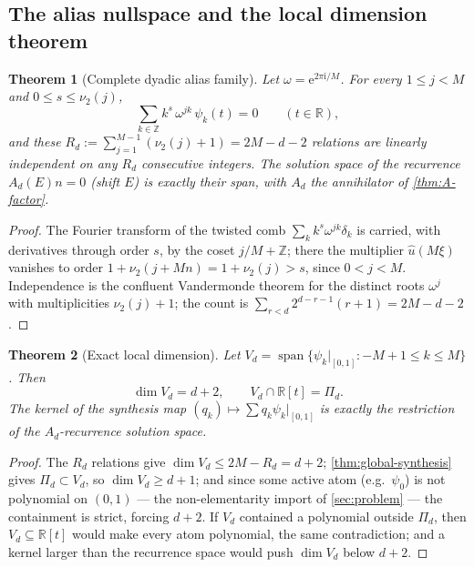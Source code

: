 \documentclass[11pt,oneside]{article}
\numberwithin{equation}{section}
\newtheorem{theorem}{Theorem}[section]
\theoremstyle{definition}
\theoremstyle{remark}
\newcommand{\R}{\mathbb R}
\newcommand{\Z}{\mathbb Z}
\newcommand{\e}{\mathrm e}
\newcommand{\ii}{\mathrm i}
\newcommand{\vtwo}{\nu_2}
\newcommand{\Span}{\operatorname{span}}
\newcommand{\PiD}{\Pi_d}
\begin{document}
\subsection{The alias nullspace and the local dimension theorem}

\begin{theorem}[Complete dyadic alias family]
\label{thm:alias-family}
Let $\omega=\e^{2\pi\ii/M}$.  For every $1\le j<M$ and
$0\le s\le\vtwo(j)$,
\begin{equation}
 \sum_{k\in\Z}k^{s}\,\omega^{jk}\,\psi_k(t)=0
 \qquad(t\in\R),
 \label{eq:alias-zero}
\end{equation}
and these $R_d:=\sum_{j=1}^{M-1}(\vtwo(j)+1)=2M-d-2$ relations are
linearly independent on any $R_d$ consecutive integers.  The solution
space of the recurrence $A_d(E)n=0$ (shift $E$) is exactly their
span, with $A_d$ the annihilator of
\cref{thm:A-factor}.
\end{theorem}

\begin{proof}
The Fourier transform of the twisted comb
$\sum_kk^{s}\omega^{jk}\delta_k$ is carried, with derivatives through
order $s$, by the coset $j/M+\Z$; there the multiplier
$\widehat u(M\xi)$ vanishes to order
$1+\vtwo(j+Mn)=1+\vtwo(j)>s$, since $0<j<M$.  Independence is the
confluent Vandermonde theorem for the distinct roots
$\omega^{j}$ with multiplicities $\vtwo(j)+1$; the count is
$\sum_{r<d}2^{d-r-1}(r+1)=2M-d-2$.
\end{proof}

\begin{theorem}[Exact local dimension]
\label{thm:local-dim}
Let $V_d=\Span\{\psi_k|_{[0,1]}:-M+1\le k\le M\}$.  Then
\begin{equation}
 \boxed{\;\dim V_d=d+2,
 \qquad
 V_d\cap\R[t]=\PiD.\;}
 \label{eq:local-dim}
\end{equation}
The kernel of the synthesis map
$(q_k)\mapsto\sum q_k\psi_k|_{[0,1]}$ is exactly the restriction of
the $A_d$-recurrence solution space.
\end{theorem}

\begin{proof}
The $R_d$ relations give $\dim V_d\le2M-R_d=d+2$;
\cref{thm:global-synthesis} gives $\PiD\subset V_d$, so
$\dim V_d\ge d+1$; and since some active atom (e.g.\ $\psi_0$) is not
polynomial on $(0,1)$ --- the non-elementarity import of
\cref{sec:problem} --- the containment is strict, forcing $d+2$.  If
$V_d$ contained a polynomial outside $\PiD$, then
$V_d\subseteq\R[t]$ would make every atom polynomial, the same
contradiction; and a kernel larger than the recurrence space would
push $\dim V_d$ below $d+2$.
\end{proof}
\end{document}
